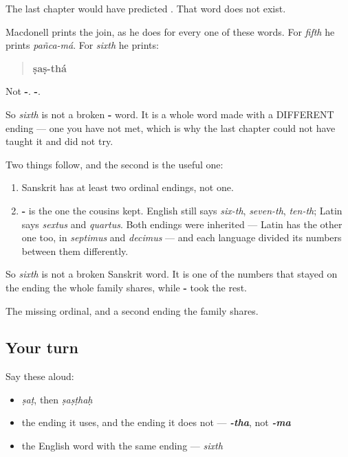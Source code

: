 The last chapter would have predicted \textbf{}. That word does not exist.

\begin{cousinweb}
Macdonell prints the join, as he does for every one of these words. For \emph{fifth} he prints \emph{pañca-má}. For \emph{sixth} he prints:

\begin{quote}
\textbf{ṣaṣ-thá}
\end{quote}

Not \textbf{-}. \textbf{-}.

So \emph{sixth} is not a broken \textbf{-} word. It is a whole word made with a DIFFERENT ending — one you have not met, which is why the last chapter could not have taught it and did not try.

Two things follow, and the second is the useful one:

\begin{enumerate}
\raggedright
  \item Sanskrit has at least two ordinal endings, not one.
  \item \textbf{-} is the one the cousins kept. English still says \emph{six-th}, \emph{seven-th}, \emph{ten-th}; Latin says \emph{sextus} and \emph{quartus}. Both endings were inherited — Latin has the other one too, in \emph{septimus} and \emph{decimus} — and each language divided its numbers between them differently.
\end{enumerate}

So \emph{sixth} is not a broken Sanskrit word. It is one of the numbers that stayed on the ending the whole family shares, while \textbf{-} took the rest.
\end{cousinweb}

\begin{grammarlens}[title={What you've built}]
The missing ordinal, and a second ending the family shares.
\end{grammarlens}

\subsection*{Your turn}
Say these aloud:

\begin{itemize}
\raggedright
  \item \emph{ṣaṭ}, then \emph{ṣaṣṭhaḥ}
  \item the ending it uses, and the ending it does not — \emph{\textbf{-tha}}, not \emph{\textbf{-ma}}
  \item the English word with the same ending — \emph{sixth}
\end{itemize}

